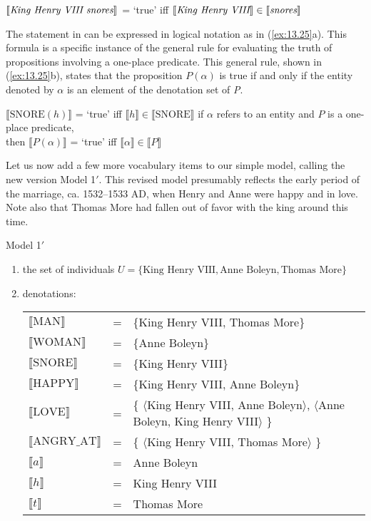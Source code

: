 \ea \label{ex:13.24}
{}$\llbracket\text{\itshape King Henry VIII snores}\rrbracket$  = ‘true’  iff  $\llbracket\text{\itshape King Henry VIII}\rrbracket \in \llbracket\text{\itshape  snores}\rrbracket$ 
\z


The statement in  can be expressed in logical notation as in (\ref{ex:13.25}a). This formula is a specific instance of the general rule for evaluating the truth of propositions involving a one-place predicate. This general rule, shown in (\ref{ex:13.25}b), states that the proposition $P(\alpha)$ is true if and only if the entity denoted by $\alpha$ is an element of the denotation set of \textit{P}.

\ea \label{ex:13.25}
\ea  $\llbracket\text{SNORE}(h)\rrbracket$  = ‘true’  iff  $\llbracket h\rrbracket \in \llbracket\text{SNORE}\rrbracket$ 
\ex  if $\alpha$ refers to an entity and $P$ is a one-place predicate,\\
  then  $\llbracket P(\alpha)\rrbracket$  = ‘true’  iff  $\llbracket \alpha \rrbracket \in \llbracket P\rrbracket$ 
\z \z


Let us now add a few more vocabulary items to our simple model, calling the new version Model 1$'$. This revised model presumably reflects the early period of the marriage, ca. 1532--1533 AD, when Henry and Anne were happy and in love. Note also that Thomas More had fallen out of favor with the king around this time.


\ea \label{ex:13.26} Model 1$'$\\
\begin{enumerate}[label=\roman*.]
\item the set of individuals $U = \{\text{King Henry VIII}, \text{Anne Boleyn}, \text{Thomas More}\}$
\item denotations:\smallskip\\
\begin{tabularx}{\linewidth}{@{}l@{~}c@{~}Q@{}}
$\llbracket\text{MAN}\rrbracket$        & = & \{King Henry VIII, Thomas More\}\\
$\llbracket\text{WOMAN}\rrbracket$      & = & \{Anne Boleyn\}\\
$\llbracket\text{SNORE}\rrbracket$      & = & \{King Henry VIII\}\\
$\llbracket\text{HAPPY}\rrbracket$      & = & \{King Henry VIII, Anne Boleyn\}\\
$\llbracket\text{LOVE}\rrbracket$       & = & \{ $\langle$King Henry VIII, Anne Boleyn$\rangle$, $\langle$Anne Boleyn, King Henry VIII$\rangle$ \}\\
$\llbracket\text{ANGRY\_AT}\rrbracket$  & = & \{ $\langle$King Henry VIII, Thomas More$\rangle$ \}\\
$\llbracket a\rrbracket$          & = & Anne Boleyn\\
$\llbracket h\rrbracket$          & = & King Henry VIII\\
$\llbracket t\rrbracket$          & = & Thomas More
\end{tabularx}
\end{enumerate}
\z


